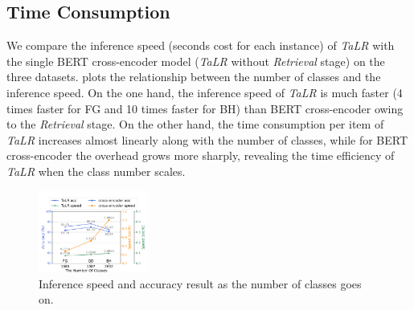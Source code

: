 \subsection{Time Consumption}
\label{sec:time cons}
We compare the inference speed (seconds cost for each instance) of \textit{TaLR} with the single BERT cross-encoder model (\textit{TaLR} without \textit{Retrieval} stage) on the three datasets.
 plots the relationship between the number of classes and the inference speed. On the one hand, the inference speed of \textit{TaLR} is much faster (4 times faster for FG and 10 times faster for BH) than BERT cross-encoder owing to the \textit{Retrieval} stage. On the other hand, the time consumption per item of \textit{TaLR} increases almost linearly along with the number of classes, while for BERT cross-encoder the overhead grows more sharply, revealing the time efficiency of \textit{TaLR} when the class number scales. 

\begin{figure}[thbp] \centering
    \includegraphics[width=0.32\textwidth]{time.pdf}
    \caption{Inference speed and accuracy result as the number of classes goes on.} 
    \label{fig:time}
\end{figure}



